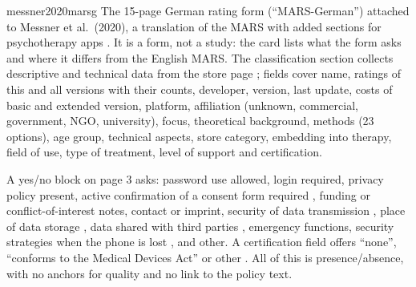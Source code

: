 \begin{papercard}{messner2020marsg}
 The 15-page German rating form (``MARS-German'') attached to Messner et al.\ (2020), a translation of the MARS with added sections for psychotherapy apps . It is a form, not a study: the card lists what the form asks and where it differs from the English MARS. The classification section collects descriptive and technical data from the store page ; fields cover name, ratings of this and all versions with their counts, developer, version, last update, costs of basic and extended version, platform, affiliation (unknown, commercial, government, NGO, university), focus, theoretical background, methods (23 options), age group, technical aspects, store category, embedding into therapy, field of use, type of treatment, level of support and certification.

 A yes/no block on page 3 asks: password use allowed, login required, privacy policy present, active confirmation of a consent form required , funding or conflict-of-interest notes, contact or imprint, security of data transmission , place of data storage , data shared with third parties , emergency functions, security strategies when the phone is lost , and other. A certification field offers ``none'', ``conforms to the Medical Devices Act'' or other . All of this is presence/absence, with no anchors for quality and no link to the policy text.


\end{papercard}
